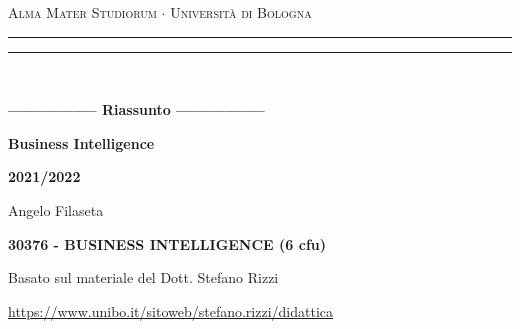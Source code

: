 \begin{titlepage}
    \begin{center}
        {{\Large{\textsc{Alma Mater Studiorum $\cdot$ Università di Bologna}}}}
        \rule[0.1cm]{15.8cm}{0.1mm}
        \rule[0.5cm]{15.8cm}{0.6mm}
        \\
        \vspace{3mm}
    \end{center}
    \vspace{2mm}
    \begin{center}
        {\LARGE{\bf{----------------- Riassunto -----------------}}}
        \vspace{5mm} \par \noindent
        {\Huge{\bf{Business Intelligence}}}
        \vspace{10mm} \par \noindent
        {\LARGE \textbf{2021/2022}}
        \vspace{15mm} \par \noindent
        {\Large Angelo Filaseta}
        \vspace{15mm} \par \noindent
        {\LARGE \bf{30376 - BUSINESS INTELLIGENCE (6 cfu)}}
        \vspace{8mm} \par \noindent
        {\Large Basato sul materiale del Dott. Stefano Rizzi}
        \vspace{5mm} \par \noindent
        {\small \url{https://www.unibo.it/sitoweb/stefano.rizzi/didattica}}
    \end{center}
    \hfill
    \vspace{40mm}
\end{titlepage}
